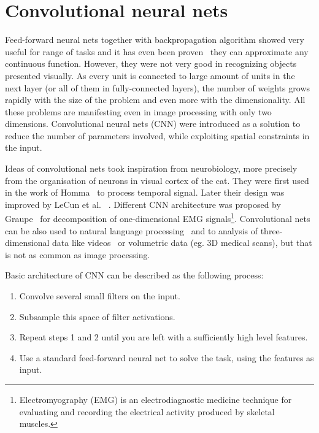 	\section{Convolutional neural nets}

Feed-forward neural nets together with backpropagation algorithm showed very useful for range of tasks and it has even been proven~\cite{cybenko:mcss,journals/nn/Hornik91} they can approximate any continuous function. However, they were not very good in recognizing objects presented visually. As every unit is connected to large amount of units in the next layer (or all of them in fully-connected layers), the number of weights grows rapidly with the size of the problem and even more with the dimensionality. All these problems are manifesting even in image processing with only two dimensions. Convolutional neural nets (CNN) were introduced as a solution to reduce the number of parameters involved, while exploiting spatial constraints in the input.

Ideas of convolutional nets took inspiration from neurobiology, more precisely from the organisation of neurons in visual cortex of the cat. They were first used in the work of Homma~\cite{NIPS1987_20} to process temporal signal. Later their design was improved by LeCun et al. ~\cite{lecun-98}. Different CNN architecture was proposed by Graupe~\cite{graupe1988} for decomposition of one-dimensional EMG signals\footnote{Electromyography (EMG) is an electrodiagnostic medicine technique for evaluating and recording the electrical activity produced by skeletal muscles.}. Convolutional nets can be also used to natural language processing~\cite{DBLP:journals/corr/Kim14f} and to analysis of three-dimensional data like videos~\cite{10.1109/TPAMI.2012.59} or volumetric data (eg. 3D medical scans), but that is not as common as image processing.

Basic architecture of CNN can be described as the following process:

\vspace{8mm}
\begin{minipage}{0.9\textwidth}
\begin{enumerate}
	\item Convolve several small filters on the input.
	\item Subsample this space of filter activations.
	\item Repeat steps 1 and 2 until you are left with a sufficiently high level features.
	\item Use a standard feed-forward neural net to solve the task, using the features as input.
\end{enumerate}
\end{minipage}
\vspace{1cm}

